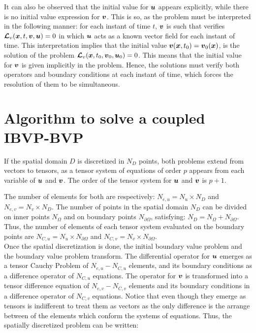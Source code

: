It can also be observed that the initial value for $\boldsymbol{u}$ appears explicitly, while there is no initial value expression for $\boldsymbol{v}$. This is so, as the problem must be interpreted in the following manner: for each instant of time $t$, $\boldsymbol{v}$ is such that verifies $\boldsymbol{\mathcal{L}}_v(\boldsymbol{x},t,\boldsymbol{v},\boldsymbol{u})=0$ in which $\boldsymbol{u}$ acts as a known vector field for each instant of time. This interpretation implies that the initial value $\boldsymbol{v}(\boldsymbol{x}, t_0) = \boldsymbol{v}_0(\boldsymbol{x}) $, is the solution of the problem $\boldsymbol{\mathcal{L}}_v(\boldsymbol{x},t_0,\boldsymbol{v}_0,\boldsymbol{u}_0)=0$. This means that the initial value for $\boldsymbol{v}$ is given implicitly in the problem. Hence, the solutions must verify both operators and boundary conditions at each instant of time, which forces the resolution of them to be simultaneous. 
       

\newpage
\section{Algorithm to solve a coupled IBVP-BVP}
If the spatial domain $D$ is discretized in $N_D$ points, both problems extend from vectors to tensors, as a tensor system of equations of order $p$ appears from each variable of $\boldsymbol{u}$ and $\boldsymbol{v}$. The order of the tensor system for $\boldsymbol{u}$ and $\boldsymbol{v}$ is $p+1 $. 
       
The number of elements for both are respectively: $N_{e,u}= {N_u} \times N_D$ and $N_{e,v}= {N_v} \times N_D$. 
The number of points in the spatial domain $N_D$ can be divided on inner points $N_{\Omega}$ and on boundary points $N_{\partial\Omega}$, satisfying: $N_D = N_{\Omega} + N_{\partial\Omega} $. Thus, the number of elements of each tensor system evaluated on the boundary points are $N_{C,u}= {N_u} \times N_{\partial\Omega}$ and $N_{C,v}= {N_v} \times N_{\partial\Omega}$. \\
       
Once the spatial discretization is done, the initial  boundary value problem and the boundary value problem transform. The differential operator for $\boldsymbol{u}$ emerges as a tensor Cauchy Problem of $N_{e,u}-N_{C,u}$ elements, and its boundary conditions as a difference operator of $N_{C,u}$ equations. The operator for $\boldsymbol{v}$ is transformed into a tensor difference equation of $N_{e,v}-N_{C,v}$ elements and its boundary conditions in a difference operator of $N_{C,v}$ equations. Notice that even though they emerge as tensors is indifferent to treat them as vectors as the only difference is the arrange between of the elements which conform the systems of equations. Thus, the spatially discretized problem can be written:
       
